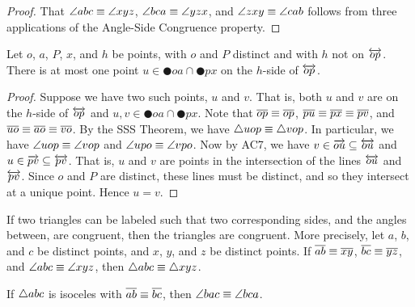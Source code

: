 \begin{proof}
That \(\angle{abc} \equiv \angle{xyz}\), \(\angle{bca} \equiv \angle{yzx}\), and \(\angle{zxy} \equiv \angle{cab}\) follows from three applications of the Angle-Side Congruence property.
\end{proof}

\begin{prop}
Let \(o\), \(a\), \(P\), \(x\), and \(h\) be points, with \(o\) and \(P\) distinct and with \(h\) not on \(\overleftrightarrow{op}\). There is at most one point \(u \in \CIRCLE{o}{a} \cap \CIRCLE{p}{x}\) on the \(h\)-side of \(\overleftrightarrow{op}\).
\end{prop}

\begin{proof}
Suppose we have two such points, \(u\) and \(v\). That is, both \(u\) and \(v\) are on the \(h\)-side of \(\overleftrightarrow{op}\) and \(u,v \in \CIRCLE{o}{a} \cap \CIRCLE{p}{x}\). Note that \(\overline{op} \equiv \overline{op}\), \(\overline{pu} \equiv \overline{px} \equiv \overline{pv}\), and \(\overline{uo} \equiv \overline{ao} \equiv \overline{vo}\). By the SSS Theorem, we have \(\bigtriangleup{uop} \equiv \bigtriangleup{vop}\). In particular, we have \(\angle{uop} \equiv \angle{vop}\) and \(\angle{upo} \equiv \angle{vpo}\). Now by AC7, we have \(v \in \overrightarrow{ou} \subseteq \overleftrightarrow{ou}\) and \(u \in \overrightarrow{pv} \subseteq \overleftrightarrow{pv}\). That is, \(u\) and \(v\) are points in the intersection of the lines \(\overleftrightarrow{ou}\) and \(\overleftrightarrow{pv}\). Since \(o\) and \(P\) are distinct, these lines must be distinct, and so they intersect at a unique point. Hence \(u = v\).
\end{proof}

\begin{prop}
If two triangles can be labeled such that two corresponding sides, and the angles between, are congruent, then the triangles are congruent. More precisely, let \(a\), \(b\), and \(c\) be distinct points, and \(x\), \(y\), and \(z\) be distinct points. If \(\overline{ab} \equiv \overline{xy}\), \(\overline{bc} \equiv \overline{yz}\), and \(\angle{abc} \equiv \angle{xyz}\), then \(\bigtriangleup{abc} \equiv \bigtriangleup{xyz}\).
\end{prop}

\begin{prop}
If \(\bigtriangleup{abc}\) is isoceles with \(\overline{ab} \equiv \overline{bc}\), then \(\angle{bac} \equiv \angle{bca}\).
\end{prop}

